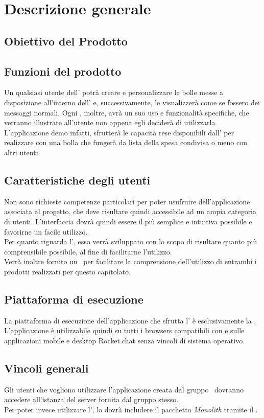 \section{Descrizione generale}
\subsection{Obiettivo del Prodotto}
\scopoProdotto

\subsection{Funzioni del prodotto}
Un qualsiasi utente dell' potrà creare e personalizzare le bolle messe a disposizione all'interno dell' e, successivamente, le visualizzerà come se fossero dei messaggi normali. Ogni , inoltre, avrà un suo uso e funzionalità specifiche, che verranno illustrate all'utente non appena egli deciderà di utilizzarla. L'applicazione demo infatti, sfrutterà le capacità rese disponibili dall' per realizzare con una bolla che fungerà da lista della spesa condivisa o meno con altri utenti.

\subsection{Caratteristiche degli utenti}
Non sono richieste competenze particolari per poter usufruire dell'applicazione associata al progetto, che deve risultare quindi accessibile ad un ampia categoria di utenti. L'interfaccia dovrà quindi essere il più semplice e intuitiva possibile e favorirne un facile utilizzo. \\
Per quanto riguarda l', esso verrà sviluppato con lo scopo di risultare quanto più comprensibile possibile, al fine di facilitarne l'utilizzo. \\
Verrà inoltre fornito un \MU\ per facilitare la comprensione dell'utilizzo di entrambi i prodotti realizzati per questo capitolato.

\subsection{Piattaforma di esecuzione} 
La piattaforma di esecuzione dell'applicazione che sfrutta l' è esclusivamente la  . L'applicazione è utilizzabile quindi su tutti i browsers compatibili con  e sulle applicazioni mobile e desktop Rocket.chat senza vincoli di sistema operativo.

\subsection{Vincoli generali}
Gli utenti che vogliono utilizzare l'applicazione creata dal gruppo \gruppo\ dovranno accedere all'istanza del server fornita dal gruppo stesso. \\
Per poter invece utilizzare l', lo  dovrà includere il pacchetto \textit{Monolith} tramite il  . 

\newpage